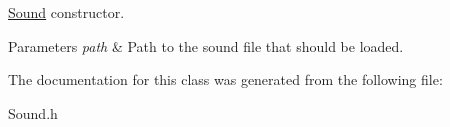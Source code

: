 \hyperlink{class_sound}{Sound} constructor. 


\begin{DoxyParams}{Parameters}
{\em path} & Path to the sound file that should be loaded. \\
\hline
\end{DoxyParams}


The documentation for this class was generated from the following file\+:\begin{DoxyCompactItemize}
\item 
Sound.\+h\end{DoxyCompactItemize}
